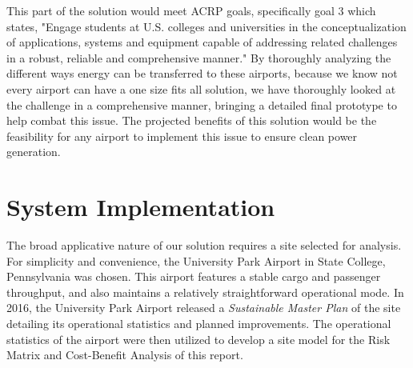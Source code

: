 \documentclass[../main.tex]{subfiles}
\begin{document}
This part of the solution would meet ACRP goals, specifically goal 3 which states, "Engage students at U.S. colleges and universities in the conceptualization of applications, systems and equipment capable of addressing related challenges in a robust, reliable and comprehensive manner."\cite{ACRPguide} By thoroughly analyzing the different ways energy can be transferred to these airports, because we know not every airport can have a one size fits all solution, we have thoroughly looked at the challenge in a comprehensive manner, bringing a detailed final prototype to help combat this issue. The projected benefits of this solution would be the feasibility for any airport to implement this issue to ensure clean power generation.\par
\newpage
\section{System Implementation}
The broad applicative nature of our solution requires a site selected for analysis. For simplicity and convenience, the University Park Airport in State College, Pennsylvania was chosen. This airport features a stable cargo and passenger throughput, and also maintains a relatively straightforward operational mode. In 2016, the University Park Airport released a \emph{Sustainable Master Plan} \cite{SCEplan} of the site detailing its operational statistics and planned improvements. The operational statistics of the airport were then utilized to develop a site model for the Risk Matrix and Cost-Benefit Analysis of this report.\par
\end{document}
